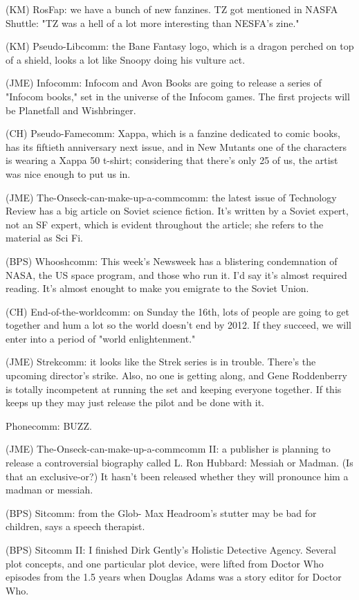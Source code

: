 \documentclass[12pt]{article}
\begin{document}
(KM) RosFap: we have a bunch of new fanzines. TZ got mentioned in NASFA Shuttle: "TZ was a hell of a lot more interesting than NESFA's zine."

(KM) Pseudo-Libcomm: the Bane Fantasy logo, which is a dragon perched on top of a shield, looks a lot like Snoopy doing his vulture act.

(JME) Infocomm: Infocom and Avon Books are going to release a series of "Infocom books," set in the universe of the Infocom games. The first projects will be Planetfall and Wishbringer.

(CH) Pseudo-Famecomm: Xappa, which is a fanzine dedicated to comic books, has its fiftieth anniversary next issue, and in New Mutants one of the characters is wearing a Xappa 50 t-shirt; considering that there's only 25 of us, the artist was nice enough to put us in.

(JME) The-Onseck-can-make-up-a-commcomm: the latest issue of Technology Review has a big article on Soviet science fiction. It's written by a Soviet expert, not an SF expert, which is evident throughout the article; she refers to the material as Sci Fi.

(BPS) Whooshcomm: This week's Newsweek has a blistering condemnation of NASA, the US space program, and those who run it. I'd say it's almost required reading. It's almost enought to make you emigrate to the Soviet Union.

(CH) End-of-the-worldcomm: on Sunday the 16th, lots of people are going to get together and hum a lot so the world doesn't end by 2012. If they succeed, we will enter into a period of "world enlightenment."

(JME) Strekcomm: it looks like the Strek series is in trouble. There's the upcoming director's strike. Also, no one is getting along, and Gene Roddenberry is totally incompetent at running the set and keeping everyone together. If this keeps up they may just release the pilot and be done with it.

Phonecomm: BUZZ.

(JME) The-Onseck-can-make-up-a-commcomm II: a publisher is planning to release a controversial biography called L. Ron Hubbard: Messiah or Madman. (Is that an exclusive-or?) It hasn't been released whether they will pronounce him a madman or messiah.

(BPS) Sitcomm: from the Glob- Max Headroom's stutter may be bad for children, says a speech therapist.

(BPS) Sitcomm II: I finished Dirk Gently's Holistic Detective Agency. Several plot concepts, and one particular plot device, were lifted from Doctor Who episodes from the 1.5 years when Douglas Adams was a story editor for Doctor Who.
\end{document}

